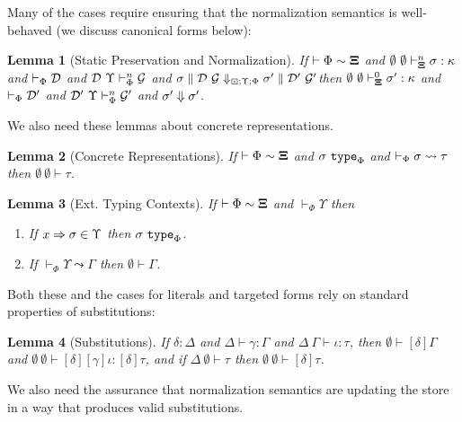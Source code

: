 \documentclass[9pt,preprint]{sigplanconf}
\newtheorem{lemma}{Lemma}
\begin{document}


Many of the cases require ensuring that the normalization semantics is well-behaved (we discuss canonical forms below):

\begin{lemma}[Static Preservation and Normalization]
If $\vdash \Phi \sim \boldsymbol\Xi$ and $\emptyset~\emptyset \vdash_{\boldsymbol\Xi}^{n} \sigma : \kappa$  and $\vdash_\Phi \mathcal{D}$ and $\mathcal{D}~\Upsilon \vdash_\Phi^n \mathcal{G}$  and $\sigma \parallel \mathcal{D}~\mathcal{G} \Downarrow_{\boxdot; \Upsilon; \Phi} \sigma' \parallel \mathcal{D}'~\mathcal{G}'$then $\emptyset~\emptyset \vdash_{\boldsymbol\Xi}^{0} \sigma' : \kappa$ and $\vdash_\Phi \mathcal{D}'$ and $\mathcal{D}'~\Upsilon \vdash_\Phi^n \mathcal{G}'$ and $\sigma' \Downarrow \sigma'$.
\end{lemma}
We also need these lemmas about concrete representations.
\begin{lemma}[Concrete Representations]
If $\vdash \Phi \sim \boldsymbol\Xi$ and $\sigma~\mathtt{type}_{\Phi}$ and $\vdash_\Phi \sigma \leadsto \tau$ then $\emptyset~\emptyset \vdash \tau$.
\end{lemma}
\begin{lemma}[Ext. Typing Contexts]
If $\vdash \Phi \sim \boldsymbol\Xi$ and $\vdash_\Phi \Upsilon$ then \begin{enumerate}
\item If $x \Rightarrow \sigma \in \Upsilon$ then $\sigma~\mathtt{type}_{\Phi}$.
\item If $\vdash_\Phi \Upsilon \leadsto \Gamma$ then $\emptyset \vdash \Gamma$.
\end{enumerate}
\end{lemma}
Both these and the cases for literals and targeted forms rely on standard properties of substitutions: 

\begin{lemma}[Substitutions] If $\delta : \Delta$  and $\Delta \vdash \gamma : \Gamma$ and $\Delta~\Gamma \vdash \iota : \tau$, then $\emptyset \vdash [\delta]\Gamma$ and $\emptyset~\emptyset \vdash [\delta][\gamma]\iota : [\delta]\tau$, and if $\Delta~\emptyset \vdash \tau$ then $\emptyset~\emptyset \vdash [\delta]\tau$.
\end{lemma} 
We also need the assurance that normalization semantics are updating the store in a way that produces  valid substitutions. 
\end{document}
